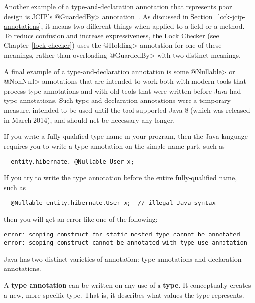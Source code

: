 Another example of a type-and-declaration annotation that represents poor
design is JCIP's \<@GuardedBy> annotation~\cite{Goetz2006}.  As discussed
in Section~\ref{lock-jcip-annotations}, it means two different things when
applied to a field or a method.  To reduce confusion and increase
expressiveness, the Lock Checker (see Chapter~\ref{lock-checker}) uses the
\<@Holding> annotation for one of these meanings, rather than overloading
\<@GuardedBy> with two distinct meanings.


A final example of a type-and-declaration annotation is some \<@Nullable>
or \<@NonNull> annotations that are intended to work both with modern tools
that process type annotations and with old tools that were written before
Java had type annotations.  Such type-and-declaration annotations were a
temporary measure, intended to be used until the tool supported Java 8
(which was released in March 2014), and
should not be necessary any longer.



If you write a fully-qualified type name in your program, then the Java
language requires you to write a type annotation on the simple name part,
such as
\begin{Verbatim}
  entity.hibernate. @Nullable User x;
\end{Verbatim}

If you try to write the type annotation before the entire fully-qualified
name, such as
\begin{Verbatim}
  @Nullable entity.hibernate.User x;  // illegal Java syntax
\end{Verbatim}
\noindent
then you will get an error like one of the following:
\begin{Verbatim}
error: scoping construct for static nested type cannot be annotated
error: scoping construct cannot be annotated with type-use annotation
\end{Verbatim}



Java has two distinct varieties of annotation:  type annotations and
declaration annotations.

A \textbf{type annotation} can be written on any use of a \textbf{type}.
It conceptually creates a new, more specific type.
That is, it describes what values the type represents.

